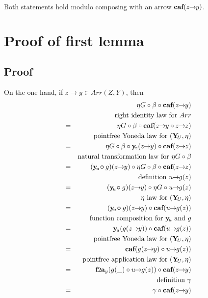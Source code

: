 \documentclass[journal]{journal}
\newcommand{\bcirc}{\bm{\circ}}
\newcommand{\prf}{\subsection{Proof}\begingroup\rm}
\newcommand{\arrow}[2]{#1\!\!\rightarrow\!\!#2}
\newcommand{\cfta}[1]{\mbox{{\normalsize {\bf f}}{\small 2}{\normalsize {\bf a}}}_{#1}}
\newcommand{\Y}{\mbox{\bf Y}}
\newcommand{\y}{\mbox{\bf y}}
\newcommand{\caf}{\mbox{\bf caf}}
\begin{document}
Both statements hold modulo composing with an arrow $\caf(\arrow{z}{y})$.

\appendices

\section{Proof of first lemma}

\prf
\setcounter{equation}{0}
On the one hand, if $\arrow{z}{y} \in Arr(Z,Y)$, then
\begin{eqnarray*}
&   & \!\!\!\!\!\!\!\!\!\!\!\!\!\!\!\! \eta G \circ \beta \circ \caf(\arrow{z}{y}) \\
&   & \mbox{right identity law for } Arr \\      
& = & \eta G \circ \beta \circ \caf(\arrow{z}{y} \circ \arrow{z}{z}) \\
&   & \mbox{pointfree Yoneda law for } (\Y\!_U, \eta) \\      
& = & \eta G \circ \beta \circ \y\!_{z}(\arrow{z}{y}) \circ \caf(\arrow{z}{z}) \\
&   & \mbox{natural transformation law for } \eta G \circ \beta \\      
& = & (\y\!_{u} \!\bcirc g)(\arrow{z}{y}) \circ \eta G \circ \beta \circ \caf(\arrow{z}{z}) \\
&   & \mbox{definition  } \arrow{u}{g(z)} \\      
& = & (\y\!_{u} \!\bcirc g)(\arrow{z}{y}) \circ \eta G \circ \arrow{u}{g(z)} \\
&   & \eta \mbox{ law for } (\Y\!_U, \eta) \\      
& = & (\y\!_{u} \!\bcirc g)(\arrow{z}{y}) \circ \caf(\arrow{u}{g(z)}) \\
&   & \mbox{function composition for } \y\!_{u} \mbox{ and } g \\      
& = & \y\!_{u}(g(\arrow{z}{y})) \circ \caf(\arrow{u}{g(z)}) \\
&   & \mbox{pointfree Yoneda law for } (\Y\!_U, \eta) \\      
& = & \caf(g(\arrow{z}{y}) \circ \arrow{u}{g(z)}) \\
&   & \mbox{pointfree application law for } (\Y\!_U, \eta) \\      
& = & \cfta{y}(g(\_) \circ \arrow{u}{g(z)}) \circ \caf(\arrow{z}{y}) \\
&   & \mbox{definition } \gamma \\      
& = & \gamma \circ \caf(\arrow{z}{y}) 
\end{eqnarray*}
\vspace{6pt}
\setcounter{equation}{0}
\end{document}
